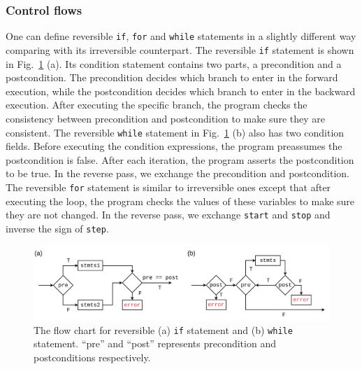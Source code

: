 \documentclass{article}
\newcommand{\<}{\langle}
\renewcommand{\>}{\rangle}
\newcommand{\Fig}[1]{Fig.~\ref{#1}}
\theoremstyle{definition}\newtheorem{definition}{\textit{Definition}}
\begin{document}
\subsubsection{Control flows}
One can define reversible \texttt{if}, \texttt{for} and \texttt{while} statements in a slightly different way comparing with its irreversible counterpart. The reversible \texttt{if} statement is shown in \Fig{fig:controlflow} (a). Its condition statement contains two parts, a precondition and a postcondition. The precondition decides which branch to enter in the forward execution, while the postcondition decides which branch to enter in the backward execution. After executing the specific branch, the program checks the consistency between precondition and postcondition to make sure they are consistent.
The reversible \texttt{while} statement in \Fig{fig:controlflow} (b) also has two condition fields. Before executing the condition expressions, the program preassumes the postcondition is false.
After each iteration, the program asserts the postcondition to be true. In the reverse pass, we exchange the precondition and postcondition.
The reversible \texttt{for} statement is similar to irreversible ones except that after executing the loop, the program checks the values of these variables to make sure they are not changed. In the reverse pass, we exchange \texttt{start} and \texttt{stop} and inverse the sign of \texttt{step}.
\begin{figure}
    \centerline{\includegraphics[width=0.9\columnwidth,trim={0 0cm 0 0cm},clip]{controlflow_v2.pdf}}
    \caption{The flow chart for reversible (a) \texttt{if} statement and (b) \texttt{while} statement. ``pre'' and ``post'' represents precondition and postconditions respectively.}\label{fig:controlflow}
\end{figure}
\end{document}
